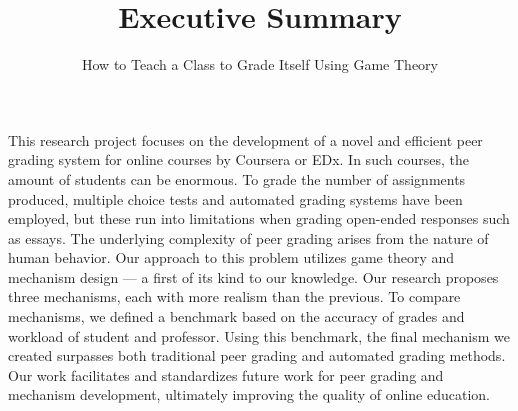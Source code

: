 \documentclass[12pt, Arial]{article}
\title{Executive Summary}
\author{How to Teach a Class to Grade Itself Using Game Theory}
\begin{document}
\maketitle
This research project focuses on the development of a novel and efficient peer grading system for online courses by Coursera or EDx. In such courses, the amount of students can be enormous. To grade the number of assignments produced, multiple choice tests and automated grading systems have been employed, but these run into limitations when grading open-ended responses such as essays. The underlying complexity of peer grading arises from the nature of human behavior. Our approach to this problem utilizes game theory and mechanism design --- a first of its kind to our knowledge. Our research proposes three mechanisms, each with more realism than the previous. To compare mechanisms, we defined a benchmark based on the accuracy of grades and workload of student and professor. Using this benchmark, the final mechanism we created surpasses both traditional peer grading and automated grading methods.  Our work facilitates and standardizes future work for peer grading and mechanism development, ultimately improving the quality of online education.
\end{document}
